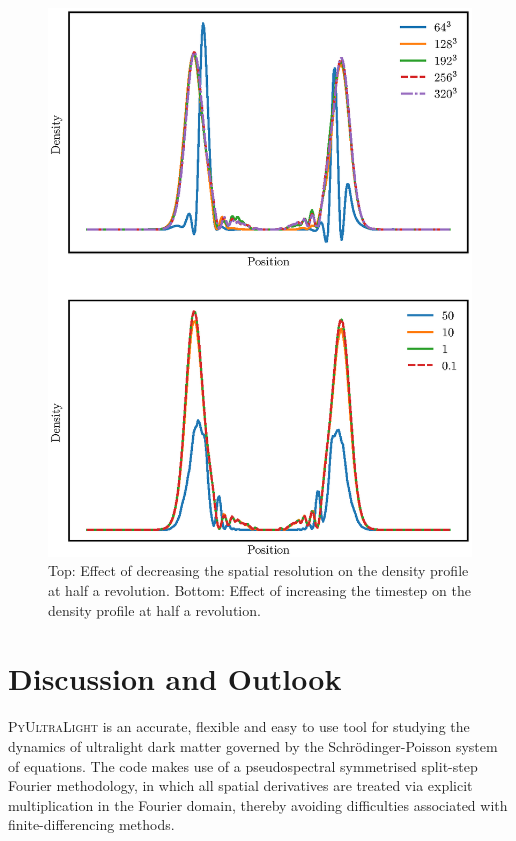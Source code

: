 \documentclass[a4paper,11pt]{article}
\newcommand{\PyUltraLight}{\textsc{PyUltraLight}\xspace}
\begin{document}
\begin{figure}
  \includegraphics[width=1.\textwidth,trim=0 1.2cm 0 2.0cm,clip]{comparison}
  \caption{Top: Effect of decreasing the spatial resolution on the density profile at half a revolution. Bottom: Effect of increasing the timestep on the density profile at half a revolution.}
  \label{fig:comparison}
\end{figure}
\clearpage


\section{Discussion and Outlook}

\PyUltraLight is an accurate, flexible and easy to use tool for  studying the dynamics of ultralight dark matter governed by the Schr{\"o}dinger-Poisson system of equations. The code makes use of a pseudospectral symmetrised split-step Fourier methodology, in which all spatial derivatives are treated via explicit multiplication in the Fourier domain, thereby avoiding difficulties associated with finite-differencing methods. 
\end{document}
